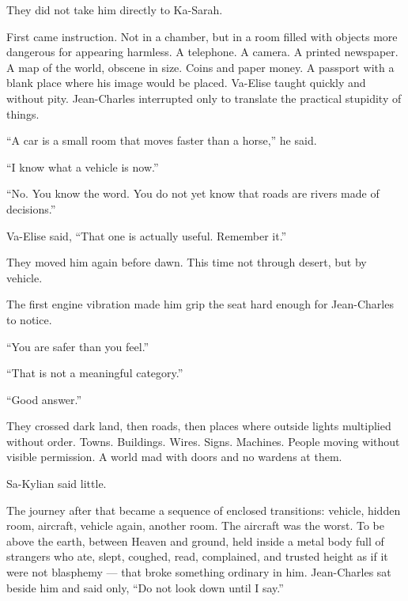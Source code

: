 They did not take him directly to Ka-Sarah.\par

First came instruction. Not in a chamber, but in a room filled with objects more dangerous for appearing harmless. A telephone. A camera. A printed newspaper. A map of the world, obscene in size. Coins and paper money. A passport with a blank place where his image would be placed. Va-Elise taught quickly and without pity. Jean-Charles interrupted only to translate the practical stupidity of things.\par

“A car is a small room that moves faster than a horse,” he said.\par

“I know what a vehicle is now.”\par

“No. You know the word. You do not yet know that roads are rivers made of decisions.”\par

Va-Elise said, “That one is actually useful. Remember it.”\par

They moved him again before dawn. This time not through desert, but by vehicle.\par

The first engine vibration made him grip the seat hard enough for Jean-Charles to notice.\par

“You are safer than you feel.”\par

“That is not a meaningful category.”\par

“Good answer.”\par

They crossed dark land, then roads, then places where outside lights multiplied without order. Towns. Buildings. Wires. Signs. Machines. People moving without visible permission. A world mad with doors and no wardens at them.\par

Sa-Kylian said little.\par

The journey after that became a sequence of enclosed transitions: vehicle, hidden room, aircraft, vehicle again, another room. The aircraft was the worst. To be above the earth, between Heaven and ground, held inside a metal body full of strangers who ate, slept, coughed, read, complained, and trusted height as if it were not blasphemy — that broke something ordinary in him. Jean-Charles sat beside him and said only, “Do not look down until I say.”\par

